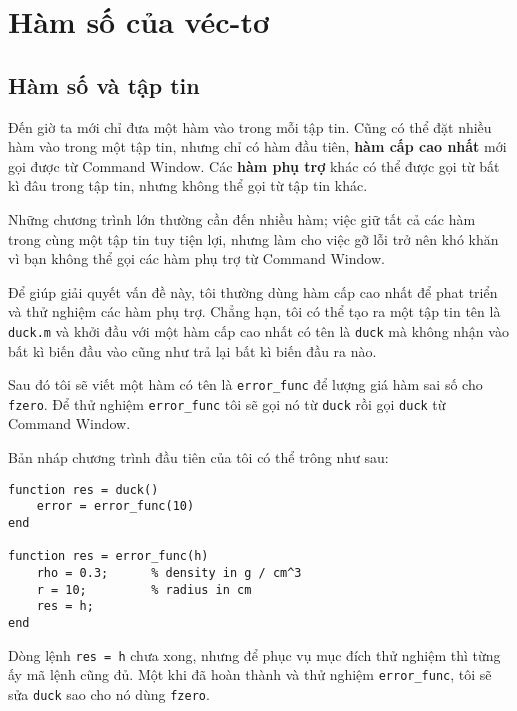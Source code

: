 \documentclass[12pt]{book}
\begin{document}










\chapter{Hàm số của véc-tơ}


\section{Hàm số và tập tin}
\label{funfiles}

Đến giờ ta mới chỉ đưa một hàm vào trong mỗi tập tin. Cũng có thể
đặt nhiều hàm vào trong một tập tin, nhưng chỉ có hàm đầu tiên,
{\bf hàm cấp cao nhất} mới gọi được từ Command Window. Các 
{\bf hàm phụ trợ} khác có thể được gọi từ bất kì đâu trong tập tin,
nhưng không thể gọi từ tập tin khác.

Những chương trình lớn thường cần đến nhiều hàm; việc giữ tất cả
các hàm trong cùng một tập tin tuy tiện lợi, nhưng làm cho việc gỡ lỗi
trở nên khó khăn vì bạn không thể gọi các hàm phụ trợ từ Command
Window.

Để giúp giải quyết vấn đề này, tôi thường dùng hàm cấp cao nhất
để phat triển và thử nghiệm các hàm phụ trợ. Chẳng hạn, tôi có thể
tạo ra một tập tin tên là {\tt duck.m} và khởi đầu với một hàm cấp 
cao nhất có tên là {\tt duck} mà không nhận vào bất kì biến đầu vào
cũng như trả lại bất kì biến đầu ra nào.

Sau đó tôi sẽ viết một hàm có tên là \verb#error_func# để lượng giá
hàm sai số cho {\tt fzero}. Để thử nghiệm \verb#error_func# tôi sẽ
gọi nó từ  {\tt duck} rồi gọi {\tt duck} từ Command Window.

Bản nháp chương trình đầu tiên của tôi có thể trông như sau:

\begin{verbatim}
function res = duck()
    error = error_func(10)
end

function res = error_func(h)
    rho = 0.3;      % density in g / cm^3
    r = 10;         % radius in cm
    res = h;
end
\end{verbatim}
%
Dòng lệnh {\tt res = h} chưa xong, nhưng để phục vụ mục đích thử nghiệm
thì từng ấy mã lệnh cũng đủ.
Một khi đã hoàn thành và thử nghiệm \verb#error_func#, tôi sẽ sửa
{\tt duck} sao cho nó dùng {\tt fzero}.
\end{document}
